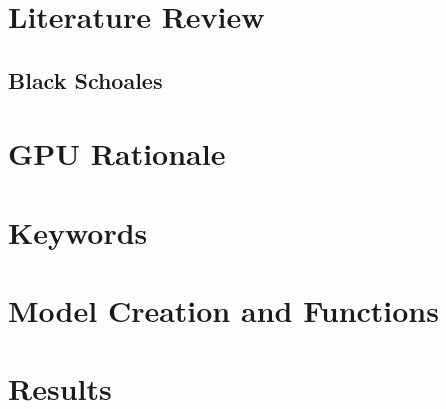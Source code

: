 \documentclass[paper=letter, fontsize=11pt]{scrartcl}
\numberwithin{equation}{section}		%
\numberwithin{figure}{section}			%
\numberwithin{table}{section}				%
\begin{document}
\begin{spacing}{2}
\section{Literature Review}
\subsection{Black Schoales}
\section{GPU Rationale}
\section{Keywords}
\section{Model Creation and Functions}
\section{Results}



\end{spacing}

 
\end{document}
